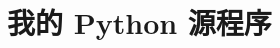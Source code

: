 \documentclass[bwprint]{gmcmthesis}
\begin{document}

% 
% 









\newpage
\appendix
\section{我的 Python 源程序}
\begin{lstlisting}[language=Python]%设置不同语言即可。



 \end{lstlisting}
\end{document}
